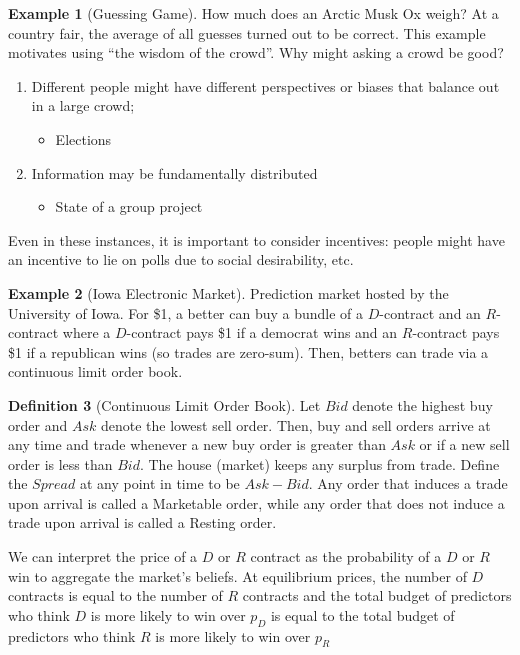 \documentclass[dvipsnames]{article}
\theoremstyle{definition}
\newtheorem{definition}{Definition}[section]
\newtheorem{example}[definition]{Example}
\theoremstyle{remark}
\begin{document}
\begin{example}[Guessing Game]
	How much does an Arctic Musk Ox weigh? At a country fair, the average of all guesses turned out to be correct. This example motivates using ``the wisdom of the crowd''. Why might asking a crowd be good?
	\begin{enumerate}
		\item Different people might have different perspectives or biases that balance out in a large crowd;
		\begin{itemize}
			\item Elections
		\end{itemize}
		\item Information may be fundamentally distributed
		\begin{itemize}
			\item State of a group project
		\end{itemize}
	\end{enumerate}
\end{example}
Even in these instances, it is important to consider incentives: people might have an incentive to lie on polls due to social desirability, etc.

\begin{example}[Iowa Electronic Market]
	Prediction market hosted by the University of Iowa. For \$1, a better can buy a bundle of a $D$-contract and an $R$-contract where a $D$-contract pays \$1 if a democrat wins and an $R$-contract pays \$1 if a republican wins (so trades are zero-sum). Then, betters can trade via a continuous limit order book.
\end{example}

\begin{definition}[Continuous Limit Order Book]
	Let $Bid$ denote the highest buy order and $Ask$ denote the lowest sell order. Then, buy and sell orders arrive at any time and trade whenever a new buy order is greater than $Ask$ or if a new sell order is less than $Bid$. The house (market) keeps any surplus from trade. Define the $Spread$ at any point in time to be $Ask-Bid$. Any order that induces a trade upon arrival is called a Marketable order, while any order that does not induce a trade upon arrival is called a Resting order.
\end{definition}

We can interpret the price of a $D$ or $R$ contract as the probability of a $D$ or $R$ win to aggregate the market's beliefs. At equilibrium prices, the number of $D$ contracts is equal to the number of $R$ contracts and the total budget of predictors who think $D$ is more likely to win over $p_D$ is equal to the total budget of predictors who think $R$ is more likely to win over $p_R$
\end{document}
